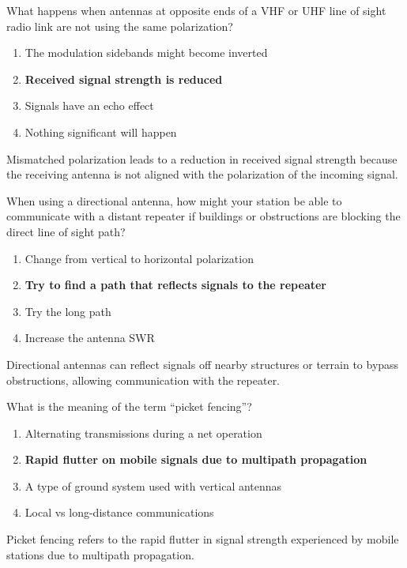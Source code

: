 
\begin{tcolorbox}[colback=gray!10!white,colframe=black!75!black,title={T3A04}]
    What happens when antennas at opposite ends of a VHF or UHF line of sight radio link are not using the same polarization?
    \begin{enumerate}[label=\Alph*,noitemsep]
        \item The modulation sidebands might become inverted
        \item \textbf{Received signal strength is reduced}
        \item Signals have an echo effect
        \item Nothing significant will happen
    \end{enumerate}
\end{tcolorbox}
Mismatched polarization leads to a reduction in received signal strength because the receiving antenna is not aligned with the polarization of the incoming signal.


\begin{tcolorbox}[colback=gray!10!white,colframe=black!75!black,title={T3A05}]
    When using a directional antenna, how might your station be able to communicate with a distant repeater if buildings or obstructions are blocking the direct line of sight path?
    \begin{enumerate}[label=\Alph*,noitemsep]
        \item Change from vertical to horizontal polarization
        \item \textbf{Try to find a path that reflects signals to the repeater}
        \item Try the long path
        \item Increase the antenna SWR
    \end{enumerate}
\end{tcolorbox}
Directional antennas can reflect signals off nearby structures or terrain to bypass obstructions, allowing communication with the repeater.


\begin{tcolorbox}[colback=gray!10!white,colframe=black!75!black,title={T3A06}]
    What is the meaning of the term “picket fencing”?
    \begin{enumerate}[label=\Alph*,noitemsep]
        \item Alternating transmissions during a net operation
        \item \textbf{Rapid flutter on mobile signals due to multipath propagation}
        \item A type of ground system used with vertical antennas
        \item Local vs long-distance communications
    \end{enumerate}
\end{tcolorbox}
Picket fencing refers to the rapid flutter in signal strength experienced by mobile stations due to multipath propagation.

